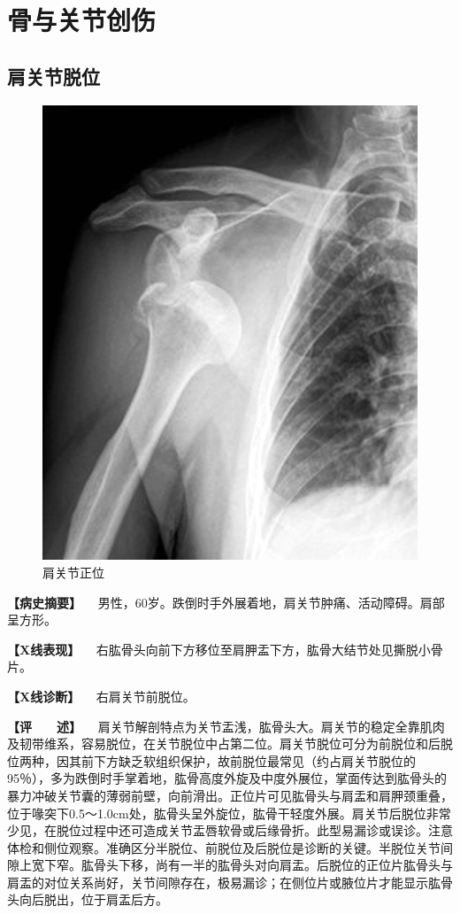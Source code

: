 \section{骨与关节创伤}

\subsection{肩关节脱位}

\begin{figure}[!htbp]
 \centering
 \includegraphics{./images/Image00028.jpg}
 \captionsetup{justification=centering}
 \caption{肩关节正位}
 \label{fig2-3-1}
  \end{figure} 

\textbf{【病史摘要】}
　男性，60岁。跌倒时手外展着地，肩关节肿痛、活动障碍。肩部呈方形。

\textbf{【X线表现】}
　右肱骨头向前下方移位至肩胛盂下方，肱骨大结节处见撕脱小骨片。

\textbf{【X线诊断】} 　右肩关节前脱位。

\textbf{【评　　述】}
　肩关节解剖特点为关节盂浅，肱骨头大。肩关节的稳定全靠肌肉及韧带维系，容易脱位，在关节脱位中占第二位。肩关节脱位可分为前脱位和后脱位两种，因其前下方缺乏软组织保护，故前脱位最常见（约占肩关节脱位的95％），多为跌倒时手掌着地，肱骨高度外旋及中度外展位，掌面传达到肱骨头的暴力冲破关节囊的薄弱前壁，向前滑出。正位片可见肱骨头与肩盂和肩胛颈重叠，位于喙突下0.5～1.0cm处，肱骨头呈外旋位，肱骨干轻度外展。肩关节后脱位非常少见，在脱位过程中还可造成关节盂唇软骨或后缘骨折。此型易漏诊或误诊。注意体检和侧位观察。准确区分半脱位、前脱位及后脱位是诊断的关键。半脱位关节间隙上宽下窄。肱骨头下移，尚有一半的肱骨头对向肩盂。后脱位的正位片肱骨头与肩盂的对位关系尚好，关节间隙存在，极易漏诊；在侧位片或腋位片才能显示肱骨头向后脱出，位于肩盂后方。

